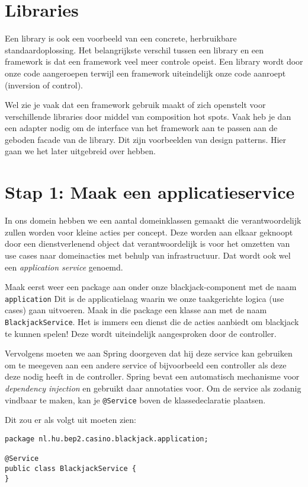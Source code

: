 \section{Libraries}
Een library is ook een voorbeeld van een concrete, herbruikbare standaardoplossing.
Het belangrijkste verschil tussen een library en een framework is dat 
een framework veel meer controle opeist. Een library wordt door onze code aangeroepen
terwijl een framework uiteindelijk onze code aanroept (inversion of control).

Wel zie je vaak dat een framework gebruik maakt of zich openstelt voor verschillende
libraries door middel van composition hot spots. Vaak heb je dan een adapter nodig 
om de interface van het framework aan te passen aan de geboden facade van de library.
Dit zijn voorbeelden van design patterns. Hier gaan we het later uitgebreid over hebben.

\section{Stap 1: Maak een applicatieservice}
In ons domein hebben we een aantal domeinklassen gemaakt die verantwoordelijk 
zullen worden voor kleine acties per concept. Deze worden aan elkaar geknoopt 
door een dienstverlenend object dat verantwoordelijk is voor het omzetten van 
use cases naar domeinacties met behulp van infrastructuur. 
Dat wordt ook wel een \textit{application service} genoemd.

Maak eerst weer een package aan onder onze blackjack-component met de naam \texttt{application}
Dit is de applicatielaag waarin we onze taakgerichte logica (use cases) gaan uitvoeren.
Maak in die package een klasse aan met de naam \texttt{BlackjackService}.
Het is immers een dienst die de acties aanbiedt om blackjack te kunnen spelen!
Deze wordt uiteindelijk aangesproken door de controller.

Vervolgens moeten we aan Spring doorgeven dat hij deze service kan gebruiken 
om te meegeven aan een andere service of bijvoorbeeld een controller als deze 
deze nodig heeft in de controller. Spring bevat een automatisch mechanisme 
voor \textit{dependency injection} en gebruikt daar annotaties voor. Om de service 
als zodanig vindbaar te maken, kan je \texttt{@Service} boven de klassedeclaratie plaatsen.

Dit zou er als volgt uit moeten zien:
\begin{verbatim}
package nl.hu.bep2.casino.blackjack.application;

@Service
public class BlackjackService {
}
\end{verbatim}

